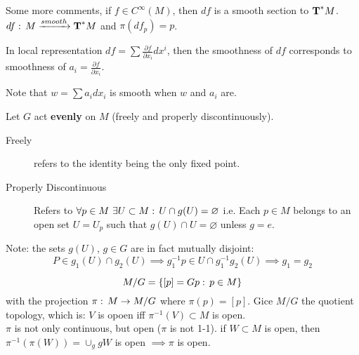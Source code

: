Some more comments, if $f\in C^\infty(M)$, then $df$ is a smooth section to $\text{\textbf{T}}^*M$.
$df:\, M \xrightarrow{smooth} \text{\textbf{T}}^*M$ and $\pi(df_p)=p$.

In local representation $df=\sum \frac{\partial f}{\partial x_i} dx^i$, then the smoothness of $df$ corresponds to smoothness of $a_i= \frac{\partial f}{\partial x_i} $.

Note that $w=\sum a_i dx_i$ is smooth when $w$ and $a_i$ are.

\begin{ddef}
Let $G$ act \textbf{evenly} on $M$ (freely and properly discontinuously).
\begin{description}
    \item[Freely] refers to the identity being the only fixed point. 
    \item[Properly Discontinuous] Refers to $\forall p\in M \ \exists U\subset M:\, U\cap g(U) = \varnothing $ i.e. Each $p\in M$ belongs to an open set $U=U_p$ such that $g(U)\cap U=\varnothing$ unless $g=e$.
\end{description}
\end{ddef}

Note: the sets $g(U)$, $g\in G$ are in fact mutually disjoint:
$$P\in g_1(U)\cap g_2(U) \implies g_1^{-1} p \in U\cap g_1 ^{-1} g_2(U) \implies g_1 = g_2$$  

\begin{ddef}
$$M/G = \{[p] = Gp:\, p\in M \}$$
with the projection $\pi :\, M\to M/G$ where $\pi(p) = [p]$. Gice $M/G $ the quotient topology, which is: $V$ is opoen iff $\pi ^{-1} (V) \subset M$ is open.\\
$\pi$ is not only continuous, but open ($\pi$ is not 1-1). if $W\subset M$ is open, then $\pi ^{-1} (\pi(W)) = \cup_g gW$ is open $\implies \pi$ is open.
\end{ddef}
